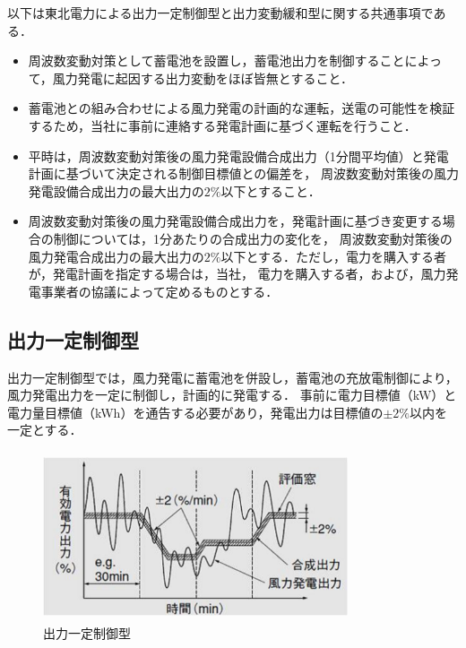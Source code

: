 \documentclass[a4paper,12pt,showkeys]{jreport}
\begin{document}
以下は東北電力\cite{風力}による出力一定制御型と出力変動緩和型に関する共通事項である．

\begin{itemize}
\item 周波数変動対策として蓄電池を設置し，蓄電池出力を制御することによって，風力発電に起因する出力変動をほぼ皆無とすること．

\item 蓄電池との組み合わせによる風力発電の計画的な運転，送電の可能性を検証するため，当社に事前に連絡する発電計画に基づく運転を行うこと．

\item 平時は，周波数変動対策後の風力発電設備合成出力（1分間平均値）と発電計画に基づいて決定される制御目標値との偏差を，
周波数変動対策後の風力発電設備合成出力の最大出力の$2\%$以下とすること．

\item 周波数変動対策後の風力発電設備合成出力を，発電計画に基づき変更する場合の制御については，1分あたりの合成出力の変化を，
周波数変動対策後の風力発電合成出力の最大出力の$2\%$以下とする．ただし，電力を購入する者が，発電計画を指定する場合は，当社，
電力を購入する者，および，風力発電事業者の協議によって定めるものとする．

\end{itemize}
\subsection{出力一定制御型}

出力一定制御型では，風力発電に蓄電池を併設し，蓄電池の充放電制御により，風力発電出力を一定に制御し，計画的に発電する．
事前に電力目標値（kW）と電力量目標値（kWh）を通告する必要があり，発電出力は目標値の$\pm2\%$以内を一定とする\cite{出力一定}．

\begin{figure}[h]
\centering
\includegraphics[width=9cm,height=5cm, clip]{seigyo1.eps}
\caption{出力一定制御型\cite{風力}}
\label{fig:seigyo1}
\end{figure}
\end{document}
